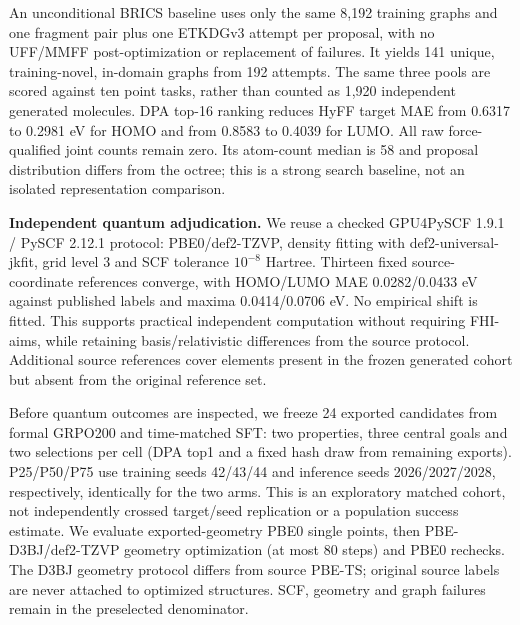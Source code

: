 \documentclass[11pt,a4paper]{article}
\begin{document}
An unconditional BRICS baseline uses only the same 8,192 training graphs
and one fragment pair plus one ETKDGv3 attempt per proposal, with no
UFF/MMFF post-optimization or replacement of failures. It yields 141
unique, training-novel, in-domain graphs from 192 attempts. The same
three pools are scored against ten point tasks, rather than counted as
1,920 independent generated molecules. DPA top-16 ranking reduces HyFF
target MAE from 0.6317 to 0.2981 eV for HOMO and from 0.8583 to 0.4039
for LUMO. All raw force-qualified joint counts remain zero. Its
atom-count median is 58 and proposal distribution differs from the
octree; this is a strong search baseline, not an isolated representation
comparison.

\textbf{Independent quantum adjudication.} We reuse a checked GPU4PySCF
1.9.1 / PySCF 2.12.1 protocol: PBE0/def2-TZVP, density fitting with
def2-universal-jkfit, grid level 3 and SCF tolerance \(10^{-8}\)
Hartree. Thirteen fixed source-coordinate references converge, with
HOMO/LUMO MAE 0.0282/0.0433 eV against published labels and maxima
0.0414/0.0706 eV. No empirical shift is fitted. This supports practical
independent computation without requiring FHI-aims, while retaining
basis/relativistic differences from the source protocol. Additional
source references cover elements present in the frozen generated cohort
but absent from the original reference set.

Before quantum outcomes are inspected, we freeze 24 exported candidates
from formal GRPO200 and time-matched SFT: two properties, three central
goals and two selections per cell (DPA top1 and a fixed hash draw from
remaining exports). P25/P50/P75 use training seeds 42/43/44 and
inference seeds 2026/2027/2028, respectively, identically for the two
arms. This is an exploratory matched cohort, not independently crossed
target/seed replication or a population success estimate. We evaluate
exported-geometry PBE0 single points, then PBE-D3BJ/def2-TZVP geometry
optimization (at most 80 steps) and PBE0 rechecks. The D3BJ geometry
protocol differs from source PBE-TS; original source labels are never
attached to optimized structures. SCF, geometry and graph failures
remain in the preselected denominator.
\end{document}
